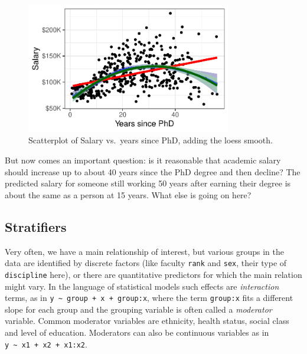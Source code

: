 \documentclass[
  letterpaper,
  10pt,
  krantz2]{krantz}
\begin{document}
\begin{figure}[H]

{\centering \includegraphics[width=0.8\textwidth,height=\textheight]{figs/ch03/fig-Salaries-loess-1.pdf}

}

\caption{\label{fig-Salaries-loess}Scatterplot of Salary vs.~years since
PhD, adding the loess smooth.}

\end{figure}

But now comes an important question: is it reasonable that academic
salary should increase up to about 40 years since the PhD degree and
then decline? The predicted salary for someone still working 50 years
after earning their degree is about the same as a person at 15 years.
What else is going on here?

\hypertarget{stratifiers}{%
\subsection{Stratifiers}\label{stratifiers}}

Very often, we have a main relationship of interest, but various groups
in the data are identified by discrete factors (like faculty
\texttt{rank} and \texttt{sex}, their type of \texttt{discipline} here),
or there are quantitative predictors for which the main relation might
vary. In the language of statistical models such effects are
\emph{interaction} terms, as in
\texttt{y\ \textasciitilde{}\ group\ +\ x\ +\ group:x}, where the term
\texttt{group:x} fits a different slope for each group and the grouping
variable is often called a \emph{moderator} variable. Common moderator
variables are ethnicity, health status, social class and level of
education. Moderators can also be continuous variables as in
\texttt{y\ \textasciitilde{}\ x1\ +\ x2\ +\ x1:x2}.
\end{document}

